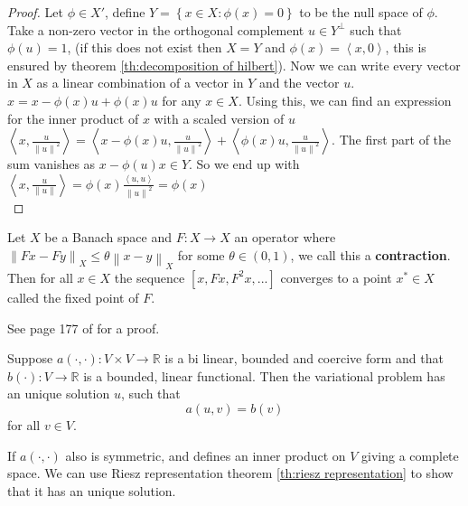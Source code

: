 \documentclass[../Main/main.tex]{subfiles}
\begin{document}
	\begin{proof}
		Let $\phi \in X'$, define $Y = \left \{ x\in X:\phi (x)=0 \right \}$ to be the null space of $\phi$. Take a non-zero vector in the orthogonal complement $u\in Y^{\bot}$ such that $\phi (u)=1$, (if this does not exist then $X=Y$ and $\phi (x) = \left \langle x, 0\right \rangle$, this is ensured by theorem \ref{th:decomposition of hilbert}). Now we can write every vector in $X$ as a linear combination of a vector in $Y$ and the vector $u$. $x = x-\phi (x) u + \phi(x) u$ for any $x \in X$. Using this, we can find an expression for the inner product of $x$ with a scaled version of $u$ \\
		$\left \langle x,\frac{u}{\left \| u \right \|^2} \right \rangle  = \left \langle x-\phi (x)u,\frac{u}{\left \| u \right \|^2} \right \rangle + \left \langle \phi (x)u,\frac{u}{\left \| u \right \|^2} \right \rangle $.
		The first part of the sum vanishes as $x - \phi (u)x \in Y$. So we end up with \\
		$\left \langle x,\frac{u}{\left \| u \right \|} \right \rangle  = \phi (x)\frac{\left \langle u,u\right \rangle}{\left \| u \right \|^2} = \phi (x)$ \\
	\end{proof}
	\begin{theorem}\label{th:Banach}
		Let $X$ be a Banach space and $F:X\rightarrow X$ an operator where $\left \|Fx-Fy\right \|_X\leq \theta \left \| x-y \right\|_X$ for some $\theta \in (0,1)$, we call this a \textbf{contraction}.\\
		Then for all $x \in X$ the sequence $[x,Fx,F^2x,...]$ converges to a point $x^* \in X$ called the fixed point of $F$.
	\end{theorem}
	See page 177 of \cite{Cheney} for a proof.
	\begin{theorem}\label{th:lax milgram}
		Suppose $a(\cdot,\cdot):V \times V \rightarrow \mathbb{R}$ is a bi linear, bounded and coercive form and that $b(\cdot): V \rightarrow \mathbb{R}$ is a bounded, linear functional. Then the variational problem has an unique solution $u$, such that
		\begin{equation}\label{eq:lax milgram}
			a(u,v)=b(v)
		\end{equation}
		for all $v \in V$.
	\end{theorem}
	\begin{remark}
		If $a(\cdot,\cdot)$ also is symmetric, and defines an inner product on $V$ giving a complete space. We can use Riesz representation theorem \ref{th:riesz representation} to show that it has an unique solution.
	\end{remark}
\end{document}

